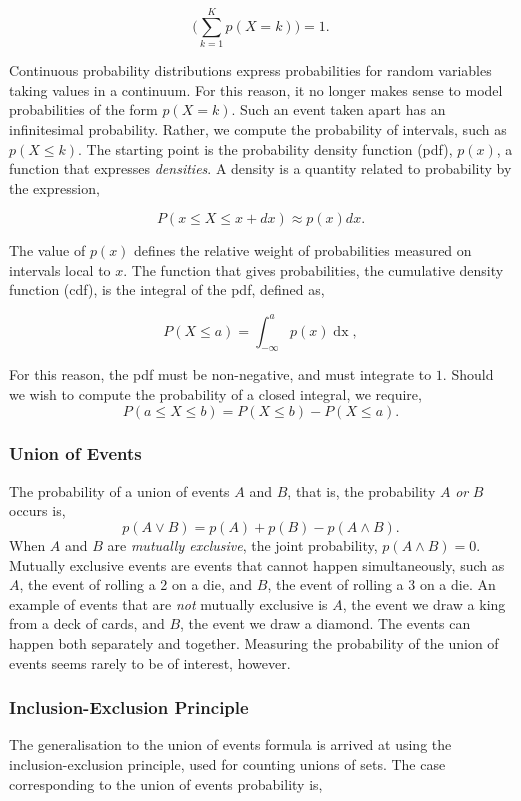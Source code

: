 \documentclass[11pt]{amsart}
\begin{document}
$$\Bigg(\sum_{k = 1}^{K} p(X = k)\Bigg) = 1.$$

Continuous probability distributions express probabilities for random variables taking values in a continuum. For this reason, it no longer makes sense to model probabilities of the form $p(X = k)$. Such an event taken apart has an infinitesimal probability. Rather, we compute the probability of intervals, such as $p(X \leq k)$. The starting point is the probability density function (pdf), $p(x)$, a function that expresses \emph{densities}. A density is a quantity related to probability by the expression,

$$P(x \leq X \leq x+dx) \approx p(x)dx.$$

The value of $p(x)$ defines the relative weight of probabilities measured on intervals local to $x$. The function that gives probabilities, the cumulative density function (cdf), is the integral of the pdf, defined as,

$$
P(X \leq a) = \int_{-\infty}^{a} p(x) \mathop{dx},
$$

For this reason, the pdf must be non-negative, and must integrate to $1$. Should we wish to compute the probability of a closed integral, we require, $$P(a \leq X \leq b) = P(X \leq b) - P(X \leq a).$$

\subsubsection{Union of Events}

The probability of a union of events $A$ and $B$, that is, the probability $A$ \emph{or} $B$ occurs is, $$p(A \lor B) = p(A) + p(B) - p(A \land B).$$ When $A$ and $B$ are \emph{mutually exclusive}, the joint probability, $p(A \land B) = 0$. Mutually exclusive events are events that cannot happen simultaneously, such as $A$, the event of rolling a 2 on a die, and $B$, the event of rolling a 3 on a die. An example of events that are \emph{not} mutually exclusive is $A$, the event we draw a king from a deck of cards, and $B$, the event we draw a diamond. The events can happen both separately and together. Measuring the probability of the union of events seems rarely to be of interest, however.

\subsubsection{Inclusion-Exclusion Principle}

The generalisation to the union of events formula is arrived at using the inclusion-exclusion principle, used for counting unions of sets. The case corresponding to the union of events probability is,
\end{document}
